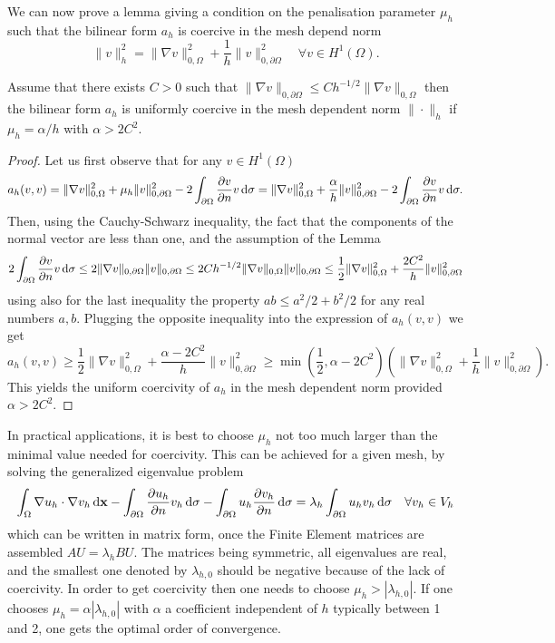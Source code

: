 We can now prove a lemma giving a condition on the penalisation parameter $\mu_h$ such that the bilinear form $a_h$ is coercive in the mesh depend norm 
$$\|v \|_h^2 =  \|\nabla v \|_{0,\Omega}^2 + \frac{1}{h} \| v \|_{0,\partial\Omega}^2\quad\forall v\in H^1(\Omega).$$ 
\begin{lemma}
Assume that there exists $C>0$ such that $\|\nabla v\|_{0,\partial\Omega} \leq C h^{-1/2} \|\nabla v\|_{0,\Omega}$ then the bilinear form $a_h$ is uniformly coercive in  the mesh dependent norm $\|\cdot\|_h$ if $\mu_h =\alpha/h$ with  $\alpha > 2C^2 $.
\end{lemma}
\begin{proof}
Let us first observe that for any $v\in H^1(\Omega)$
$$a_h(v,v)= \|\nabla v\|_{0,\Omega}^2 + \mu_h\| v\|_{0,\partial\Omega}^2
- 2 \int_{\partial \Omega} \frac{\partial v}{\partial n} v \,{\rm d} \sigma=
 \|\nabla v\|_{0,\Omega}^2 + \frac{\alpha}{h}\| v\|_{0,\partial\Omega}^2
- 2 \int_{\partial \Omega} \frac{\partial v}{\partial n} v \,{\rm d} \sigma.$$
Then, using the Cauchy-Schwarz inequality, the fact that the components of the normal vector are less than one, and the assumption of the Lemma
$$ 2\int_{\partial \Omega} \frac{\partial v}{\partial n} v \,{\rm d} \sigma \leq  2\|\nabla v\|_{0,\partial \Omega}
\|v\|_{0,\partial\Omega} 
\leq   2C h^{-1/2} \|\nabla v\|_{0,\Omega} \|v\|_{0,\partial\Omega} 
\leq \frac 12 \|\nabla v\|_{0,\Omega}^2 +  \frac{2C^2}{h} \|v\|_{0,\partial\Omega}^2
$$
using also for the last inequality the property $ab \leq a^2/2 + b^2/2$ for any real numbers $a,b$.
Plugging the opposite inequality into the expression of $a_h(v,v)$ we get
$$a_h(v,v) \geq \frac 12 \|\nabla v\|_{0,\Omega}^2  +  \frac{\alpha -  2C^2}{h} \|v\|_{0,\partial\Omega}^2
\geq \min ( \frac 12, \alpha -  2C^2 ) (   \|\nabla v\|_{0,\Omega}^2  + \frac 1h\|v\|_{0,\partial\Omega}^2) .$$
This yields the uniform coercivity of $a_h$ in the mesh dependent norm provided $\alpha> 2C^2 $.
\end{proof}

\begin{remark}
In practical applications, it is best to choose $\mu_h$ not too much larger than the minimal value needed for coercivity. This can be achieved for a given mesh, by solving the generalized eigenvalue problem 
$$ \int_\Omega \nabla u_h \cdot \nabla v_h \,{\rm d} \mathbf{x} 
- \int_{\partial \Omega} \frac{\partial u_h}{\partial n} v_h \,{\rm d} \sigma -\int_{\partial \Omega} u_h \frac{\partial v_h}{\partial n} \,{\rm d} \sigma = \lambda_h\int_{\partial \Omega} u_h v_h \,{\rm d} \sigma \quad\forall v_h \in V_h
$$
which can be written in matrix form, once the Finite Element matrices are assembled
$A U = \lambda_h BU$. The matrices being symmetric, all eigenvalues are real, and the smallest one denoted by $\lambda_{h,0}$ should be negative because of the lack of coercivity.
In order to get coercivity then one needs to choose $\mu_h > |\lambda_{h,0}|$. 
If one chooses $\mu_h = \alpha  |\lambda_{h,0}|$ with $\alpha$ a coefficient independent of $h$ typically between 1 and 2, one gets the optimal order of convergence.
\end{remark}




